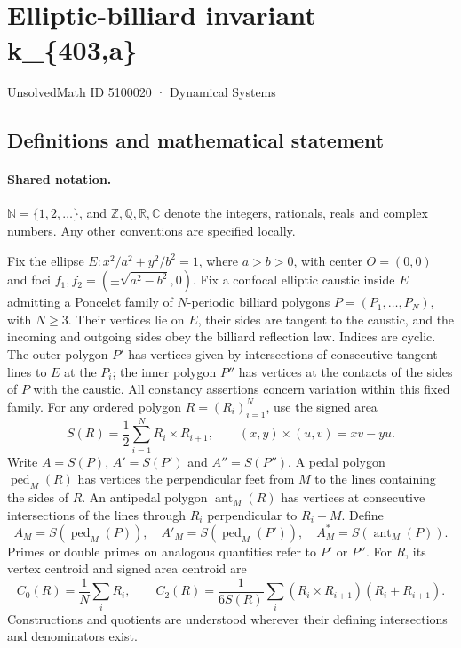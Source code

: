 \documentclass[11pt]{article}
\begin{document}
\setcounter{section}{5100019}
\section{Elliptic-billiard invariant k\_\{403,a\}}\label{5100020}
{\small\sffamily UnsolvedMath ID 5100020 · Dynamical Systems}
\subsection{Definitions and mathematical statement}

\paragraph{Shared notation.}$\mathbb N=\{1,2,\ldots\}$, and $\mathbb Z,\mathbb Q,\mathbb R,\mathbb C$ denote the integers, rationals, reals and complex numbers. Any other conventions are specified locally.


Fix the ellipse $E:x^2/a^2+y^2/b^2=1$, where $a>b>0$, with center $O=(0,0)$ and foci $f_1,f_2=(\pm\sqrt{a^2-b^2},0)$. Fix a confocal elliptic caustic inside $E$ admitting a Poncelet family of $N$-periodic billiard polygons $P=(P_1,\ldots,P_N)$, with $N\geq3$. Their vertices lie on $E$, their sides are tangent to the caustic, and the incoming and outgoing sides obey the billiard reflection law. Indices are cyclic. The outer polygon $P'$ has vertices given by intersections of consecutive tangent lines to $E$ at the $P_i$; the inner polygon $P''$ has vertices at the contacts of the sides of $P$ with the caustic. All constancy assertions concern variation within this fixed family.
For any ordered polygon $R=(R_i)_{i=1}^N$, use the signed area
\[S(R)=\frac12\sum_{i=1}^N R_i\times R_{i+1},\qquad (x,y)\times(u,v)=xv-yu.\]
Write $A=S(P)$, $A'=S(P')$ and $A''=S(P'')$. A pedal polygon $\operatorname{ped}_M(R)$ has vertices the perpendicular feet from $M$ to the lines containing the sides of $R$. An antipedal polygon $\operatorname{ant}_M(R)$ has vertices at consecutive intersections of the lines through $R_i$ perpendicular to $R_i-M$. Define
\[A_M=S(\operatorname{ped}_M(P)),\quad A'_M=S(\operatorname{ped}_M(P')),\quad A_M^*=S(\operatorname{ant}_M(P)).\]
Primes or double primes on analogous quantities refer to $P'$ or $P''$. For $R$, its vertex centroid and signed area centroid are
\[C_0(R)=\frac1N\sum_i R_i,\qquad C_2(R)=\frac{1}{6S(R)}\sum_i(R_i\times R_{i+1})(R_i+R_{i+1}).\]
Constructions and quotients are understood wherever their defining intersections and denominators exist.
\end{document}
